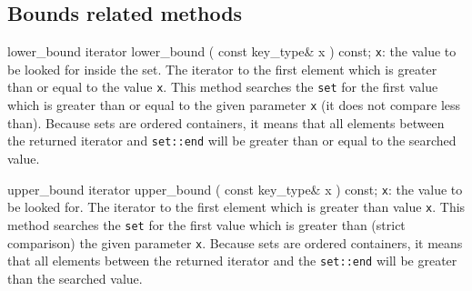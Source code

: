 \subsection{Bounds related methods} %
\begin{methodinfo}
  {lower_bound}
  {iterator lower_bound ( const key_type& x ) const;}
  {\texttt{x}: the value to be looked for inside the set.}
  {The iterator to the first element which is greater than or equal to the value \texttt{x}.}
  {This method searches the \texttt{set} for the first value which is greater than or equal to 
  the given parameter \texttt{x} (it does not compare less than). Because sets are ordered containers, 
  it means that all elements between the returned iterator and \texttt{set::end} will be greater than or 
  equal to the searched value.}
\end{methodinfo}
\begin{methodinfo}
  {upper_bound}
  {iterator upper_bound ( const key_type& x ) const;}
  {\texttt{x}: the value to be looked for.}
  {The iterator to the first element which is greater than value \texttt{x}.}
  {This method searches the \texttt{set} for the first value which is greater than (strict comparison) 
  the given parameter \texttt{x}. Because sets are ordered containers, it means that all elements between 
  the returned iterator and the \texttt{set::end} will be greater than the searched value.}
\end{methodinfo}
